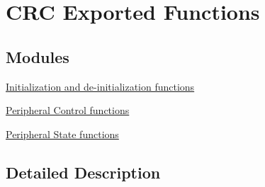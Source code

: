 \hypertarget{group___c_r_c___exported___functions}{}\section{C\+RC Exported Functions}
\label{group___c_r_c___exported___functions}
\subsection*{Modules}
\begin{DoxyCompactItemize}
\item 
\hyperlink{group___c_r_c___exported___functions___group1}{Initialization and de-\/initialization functions}
\item 
\hyperlink{group___c_r_c___exported___functions___group2}{Peripheral Control functions}
\item 
\hyperlink{group___c_r_c___exported___functions___group3}{Peripheral State functions}
\end{DoxyCompactItemize}


\subsection{Detailed Description}
